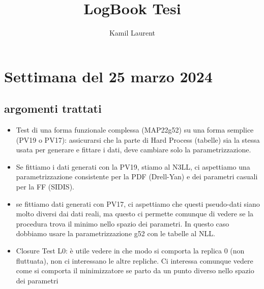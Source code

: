 \documentclass{article}
\title{LogBook Tesi}
\author{Kamil Laurent}
\begin{document}
\maketitle

\section*{Settimana del 25 marzo 2024}
\subsection{argomenti trattati}
\begin{itemize}
    \item Test di una forma funzionale complessa (MAP22g52) su una forma semplice (PV19 o PV17):
    assicurarsi che la parte di Hard Process (tabelle) sia la stessa usata per generare e fittare i dati, deve cambiare solo la parametrizzazione. 
    \item Se fittiamo i dati generati con la PV19, stiamo al N3LL, ci aspettiamo una parametrizzazione consistente per la PDF (Drell-Yan) e dei parametri casuali per la FF (SIDIS).
    \item se fittiamo dati generati con PV17, ci aspettiamo che questi pseudo-dati siano molto diversi dai dati reali, ma questo ci permette comunque di vedere se la procedura trova il minimo nello spazio dei parametri. In questo caso dobbiamo usare la parametrizzazione g52 con le tabelle al NLL.
    \item Closure Test L0: è utile vedere in che modo si comporta la replica 0 (non fluttuata), non ci interessano le altre repliche. Ci interessa comunque vedere come si comporta il minimizzatore se parto da un punto diverso nello spazio dei parametri
    
\end{itemize}
\end{document}
